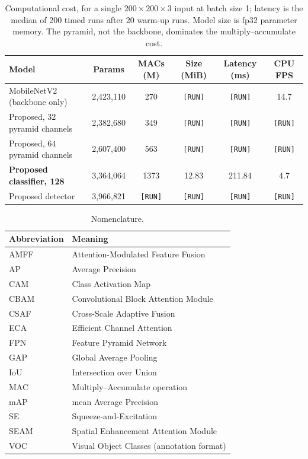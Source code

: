 \begin{table}[t]
\centering
\caption{Computational cost, for a single $200\times200\times3$ input at batch size 1; latency is the median of 200 timed runs after 20 warm-up runs. Model size is fp32 parameter memory. The pyramid, not the backbone, dominates the multiply--accumulate cost.}
\label{tab:efficiency}
\renewcommand{\arraystretch}{1.15}
\begin{tabular}{lccccc}
\toprule
\textbf{Model} & \textbf{Params} & \textbf{MACs (M)} & \textbf{Size (MiB)} & \textbf{Latency (ms)} & \textbf{CPU FPS} \\
\midrule
MobileNetV2 (backbone only) & 2{,}423{,}110 & 270 & \texttt{[RUN]} & \texttt{[RUN]} & 14.7 \\
Proposed, 32 pyramid channels & 2{,}382{,}680 & 349 & \texttt{[RUN]} & \texttt{[RUN]} & \texttt{[RUN]} \\
Proposed, 64 pyramid channels & 2{,}607{,}400 & 563 & \texttt{[RUN]} & \texttt{[RUN]} & \texttt{[RUN]} \\
\textbf{Proposed classifier, 128} & 3{,}364{,}064 & 1373 & 12.83 & 211.84 & 4.7 \\
\midrule
Proposed detector & 3{,}966{,}821 & \texttt{[RUN]} & \texttt{[RUN]} & \texttt{[RUN]} & \texttt{[RUN]} \\
\bottomrule
\end{tabular}
\end{table}


\begin{table}[t]
\centering
\caption{Nomenclature.}
\label{tab:nomenclature}
\renewcommand{\arraystretch}{1.15}
\begin{tabular}{ll}
\toprule
\textbf{Abbreviation} & \textbf{Meaning} \\
\midrule
AMFF & Attention-Modulated Feature Fusion \\
AP & Average Precision \\
CAM & Class Activation Map \\
CBAM & Convolutional Block Attention Module \\
CSAF & Cross-Scale Adaptive Fusion \\
ECA & Efficient Channel Attention \\
FPN & Feature Pyramid Network \\
GAP & Global Average Pooling \\
IoU & Intersection over Union \\
MAC & Multiply--Accumulate operation \\
mAP & mean Average Precision \\
SE & Squeeze-and-Excitation \\
SEAM & Spatial Enhancement Attention Module \\
VOC & Visual Object Classes (annotation format) \\
\bottomrule
\end{tabular}
\end{table}


